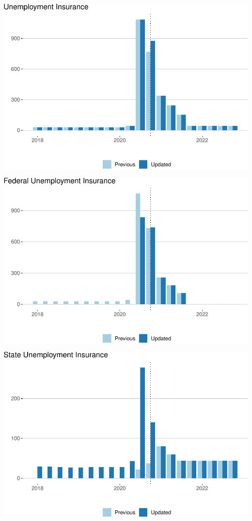 \documentclass[
]{article}
\begin{document}
\begin{center}\includegraphics{update-changes-levels_files/figure-latex/unemployment_insurance-1} \end{center}

\begin{center}\includegraphics{update-changes-levels_files/figure-latex/federal_unemployment_insurance-1} \end{center}

\begin{center}\includegraphics{update-changes-levels_files/figure-latex/state_unemployment_insurance-1} \end{center}
\end{document}
